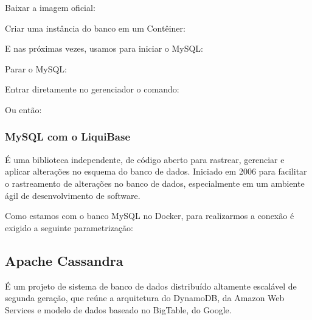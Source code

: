 \documentclass[a4paper,11pt]{article}
\begin{document}
Baixar a imagem oficial: \\

Criar uma instância do banco em um Contêiner: \\

E nas próximas vezes, usamos para iniciar o MySQL: \\

Parar o MySQL: \\

Entrar diretamente no gerenciador o comando: \\

Ou então: \\

\subsubsection{MySQL com o LiquiBase}
É uma biblioteca independente, de código aberto para rastrear, gerenciar e aplicar alterações no esquema do banco de dados. Iniciado em 2006 para facilitar o rastreamento de alterações no banco de dados, especialmente em um ambiente ágil de desenvolvimento de software. 

Como estamos com o banco MySQL no Docker, para realizarmos a conexão é exigido a seguinte parametrização: \\ 

\subsection{Apache Cassandra}
É um projeto de sistema de banco de dados distribuído altamente escalável de segunda geração, que reúne a arquitetura do DynamoDB, da Amazon Web Services e modelo de dados baseado no BigTable, do Google. 
\end{document}
